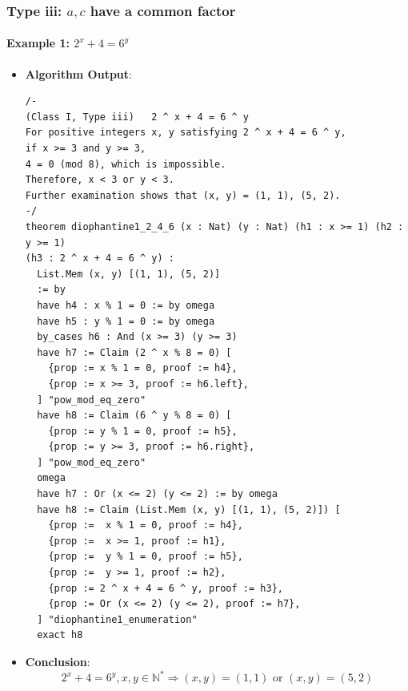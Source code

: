 \documentclass{article}
\begin{document}
\subsubsection{Type iii: $a, c$ have a common factor}
\paragraph{Example 1: $2^x+4=6^y$}
\begin{itemize}
\item \textbf{Algorithm Output}:
    \begin{verbatim}
/-
(Class I, Type iii)   2 ^ x + 4 = 6 ^ y
For positive integers x, y satisfying 2 ^ x + 4 = 6 ^ y,
if x >= 3 and y >= 3,
4 = 0 (mod 8), which is impossible.
Therefore, x < 3 or y < 3.
Further examination shows that (x, y) = (1, 1), (5, 2).
-/
theorem diophantine1_2_4_6 (x : Nat) (y : Nat) (h1 : x >= 1) (h2 : y >= 1) 
(h3 : 2 ^ x + 4 = 6 ^ y) :      
  List.Mem (x, y) [(1, 1), (5, 2)]
  := by
  have h4 : x % 1 = 0 := by omega
  have h5 : y % 1 = 0 := by omega
  by_cases h6 : And (x >= 3) (y >= 3)
  have h7 := Claim (2 ^ x % 8 = 0) [
    {prop := x % 1 = 0, proof := h4},
    {prop := x >= 3, proof := h6.left},
  ] "pow_mod_eq_zero"
  have h8 := Claim (6 ^ y % 8 = 0) [
    {prop := y % 1 = 0, proof := h5},
    {prop := y >= 3, proof := h6.right},
  ] "pow_mod_eq_zero"
  omega
  have h7 : Or (x <= 2) (y <= 2) := by omega
  have h8 := Claim (List.Mem (x, y) [(1, 1), (5, 2)]) [
    {prop :=  x % 1 = 0, proof := h4},
    {prop :=  x >= 1, proof := h1},
    {prop :=  y % 1 = 0, proof := h5},
    {prop :=  y >= 1, proof := h2},
    {prop := 2 ^ x + 4 = 6 ^ y, proof := h3},
    {prop := Or (x <= 2) (y <= 2), proof := h7},
  ] "diophantine1_enumeration"
  exact h8
    \end{verbatim}
    \item \textbf{Conclusion}:
    \[ 2^x+4=6^y, x, y \in \mathbb{N}^* \Rightarrow (x,y)=(1,1) \text{ or } (x,y)=(5,2) \]
\end{itemize}
\end{document}
